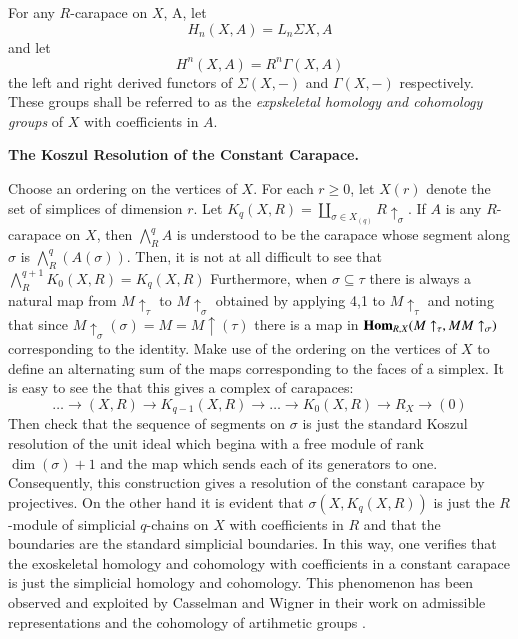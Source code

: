 \begin{definition}\label{chap6-definition-1.9}
For any $R$-carapace on $X$, A, let
$$
H_{n}(X, A)= L_{n}\Sigma{X, A}
$$
and let
$$
H^{n}(X, A) = R^{n}\Gamma(X, A)
$$
the left and right derived functors of $\Sigma(X, -)$ and $\Gamma(X, -)$ respectively. These groups shall be referred to as the \textit{expskeletal homology and cohomology groups} of $X$ with coefficients in $A$.
\end{definition}

\begin{secexam}
\textbf{The Koszul Resolution of the Constant Carapace.}

Choose an ordering on the vertices of $X$. For each $r \geq 0$, let $X(r)$ denote the set of simplices of dimension $r$. Let $K_{q}(X, R) = \coprod _{\sigma \in X_{(q)}} R \uparrow_{\sigma}$. If $A$ is any $R$-carapace on $X$, then $\bigwedge_{R}^{q}A$ is understood to be the carapace whose segment along $\sigma$ is $\bigwedge_{R}^{q}(A(\sigma))$. Then, it is not at all difficult to see that $\bigwedge_{R}^{q+1}K_{0}(X, R) = K_{q}(X, R)$ Furthermore, when
$\sigma \subseteq \tau$ there is always a natural map from $M\uparrow_{\tau}$ to $M \uparrow_{\sigma}$ obtained by applying 4,1 to $M\uparrow_{\tau}$ and noting that since $M\uparrow_{\sigma}(\sigma) = M = M\uparrow(\tau)$ there is a map in $\operatorname{\mathbf{Hom}}_{R, X}(M\uparrow_{\tau}, MM\uparrow_{\sigma})$ corresponding to the identity. Make use of the ordering on the vertices of $X$ to define an alternating sum of the maps corresponding to the faces of a simplex. It is easy to see the that this gives a complex of carapaces:
$$
\ldots \rightarrow (X, R)\rightarrow K_{q-1}(X, R)\rightarrow\ldots \rightarrow K_{0}(X, R)\rightarrow R_{X}\rightarrow(0)
$$ 
Then check that the sequence of segments on $\sigma$ is just the standard Koszul resolution of the unit ideal which begina with a free module of rank $\dim(\sigma) + 1$ and the map which sends each of its generators to one. Consequently, this construction gives a resolution of the constant carapace by projectives. On the other hand it is evident that $\sigma(X, K_{q}(X, R))$ is just the $R$-module of simplicial $q$-chains on $X$ with coefficients in $R$ and that the boundaries are the standard simplicial boundaries. In this way, one verifies that the exoskeletal homology and cohomology with coefficients in a constant carapace is just the simplicial homology and cohomology. This phenomenon has been observed and exploited by Casselman and Wigner in their work on admissible representations and the cohomology of artihmetic groups \cite{chap6-keyCW}.
\end{secexam}

